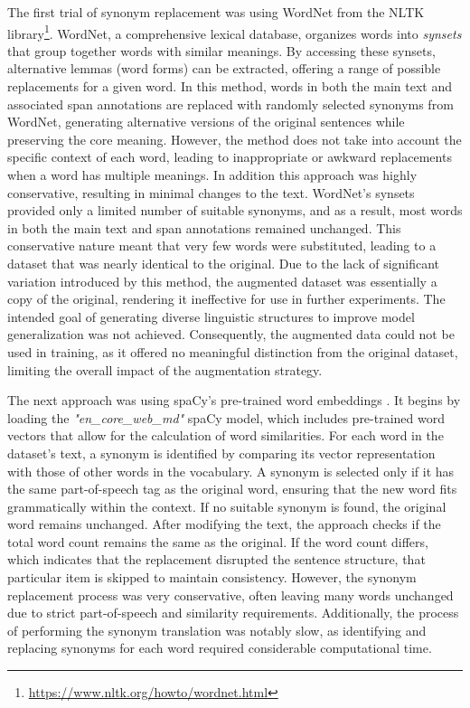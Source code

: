 \documentclass{Configuration_Files/PoliMi3i_thesis}
\begin{document}
The first trial of synonym replacement was using WordNet from the NLTK library\footnote{\url{https://www.nltk.org/howto/wordnet.html}}. WordNet, a comprehensive lexical database, organizes words into \textit{synsets} that group together words with similar meanings. By accessing these synsets, alternative lemmas (word forms) can be extracted, offering a range of possible replacements for a given word. In this method, words in both the main text and associated span annotations are replaced with randomly selected synonyms from WordNet, generating alternative versions of the original sentences while preserving the core meaning. However, the method does not take into account the specific context of each word, leading to inappropriate or awkward replacements when a word has multiple meanings. In addition this approach was highly conservative, resulting in minimal changes to the text. WordNet's synsets provided only a limited number of suitable synonyms, and as a result, most words in both the main text and span annotations remained unchanged. This conservative nature meant that very few words were substituted, leading to a dataset that was nearly identical to the original. Due to the lack of significant variation introduced by this method, the augmented dataset was essentially a copy of the original, rendering it ineffective for use in further experiments. The intended goal of generating diverse linguistic structures to improve model generalization was not achieved. Consequently, the augmented data could not be used in training, as it offered no meaningful distinction from the original dataset, limiting the overall impact of the augmentation strategy.

The next approach was using spaCy's pre-trained word embeddings \cite{altinok2021mastering}. It begins by loading the \textit{"en\_core\_web\_md"} spaCy model, which includes pre-trained word vectors that allow for the calculation of word similarities. For each word in the dataset’s text, a synonym is identified by comparing its vector representation with those of other words in the vocabulary. A synonym is selected only if it has the same part-of-speech tag as the original word, ensuring that the new word fits grammatically within the context. If no suitable synonym is found, the original word remains unchanged. After modifying the text, the approach checks if the total word count remains the same as the original. If the word count differs, which indicates that the replacement disrupted the sentence structure, that particular item is skipped to maintain consistency. However, the synonym replacement process was very conservative, often leaving many words unchanged due to strict part-of-speech and similarity requirements. Additionally, the process of performing the synonym translation was notably slow, as identifying and replacing synonyms for each word required considerable computational time.
 
\end{document}
